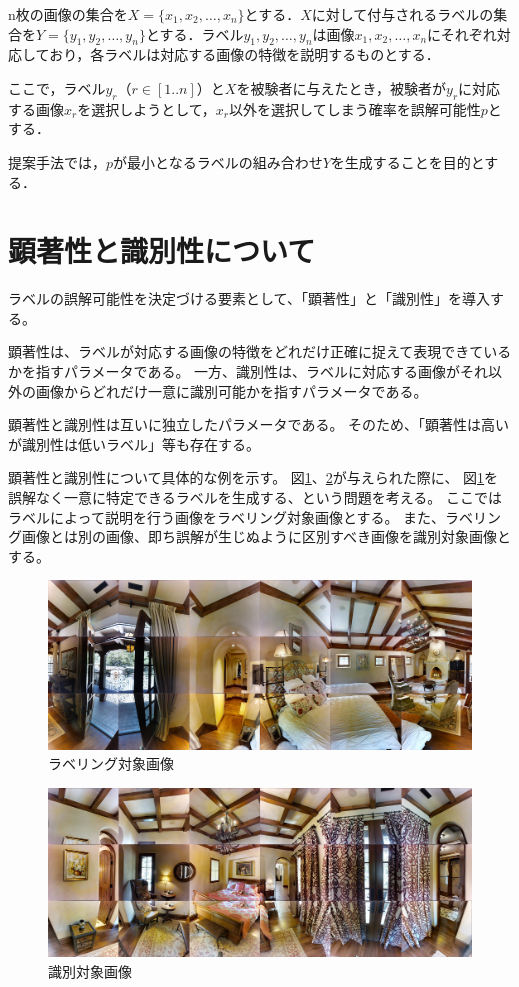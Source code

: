 \documentclass[a4paper,11pt]{jreport}
\begin{document}
n枚の画像の集合を\(X = \{x_1, x_2, \ldots, x_n\}\)とする．\(X\)に対して付与されるラベルの集合を\(Y = \{y_1, y_2, \ldots, y_n\}\)とする．ラベル\(y_1, y_2, \ldots, y_n\)は画像\(x_1, x_2, \ldots, x_n\)にそれぞれ対応しており，各ラベルは対応する画像の特徴を説明するものとする．

ここで，ラベル\(y_r\)（$r \in [1..n]$）と\(X\)を被験者に与えたとき，被験者が\(y_r\)に対応する画像\(x_r\)を選択しようとして，\(x_r\)以外を選択してしまう確率を誤解可能性\(p\)とする．

提案手法では，\(p\)が最小となるラベルの組み合わせ\(Y\)を生成することを目的とする．

\section{顕著性と識別性について}

ラベルの誤解可能性を決定づける要素として、「顕著性」と「識別性」を導入する。

顕著性は、ラベルが対応する画像の特徴をどれだけ正確に捉えて表現できているかを指すパラメータである。
一方、識別性は、ラベルに対応する画像がそれ以外の画像からどれだけ一意に識別可能かを指すパラメータである。

顕著性と識別性は互いに独立したパラメータである。
そのため、「顕著性は高いが識別性は低いラベル」等も存在する。

顕著性と識別性について具体的な例を示す。
図\ref{fig:white_bed}、\ref*{fig:pink_bed}が与えられた際に、
図\ref{fig:white_bed}を誤解なく一意に特定できるラベルを生成する、という問題を考える。
ここではラベルによって説明を行う画像をラベリング対象画像とする。
また、ラベリング画像とは別の画像、即ち誤解が生じぬように区別すべき画像を識別対象画像とする。

\begin{figure}[H]
	\centering
	\includegraphics[width=0.8\linewidth]{figures/3-2_white_bed.jpg}
	\caption{ラベリング対象画像}
	\label{fig:white_bed}
\end{figure}

\begin{figure}[H]
	\centering
	\includegraphics[width=0.8\linewidth]{figures/3-2_pink_bed.jpg}
	\caption{識別対象画像}
	\label{fig:pink_bed}
\end{figure}
\end{document}
